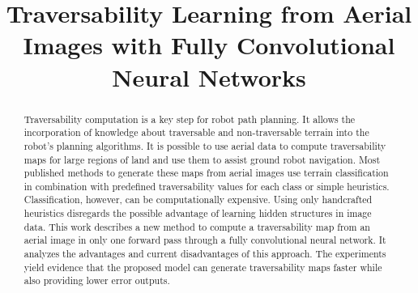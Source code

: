 \documentclass[conference]{IEEEtran}
\begin{document}
\title{Traversability Learning from Aerial Images with Fully Convolutional Neural Networks\\
}

\author{
}

\maketitle

\begin{abstract}
Traversability computation is a key step for robot path planning.
It allows the incorporation of knowledge about traversable and non-traversable terrain into the robot's planning algorithms.
It is possible to use aerial data to compute traversability maps for large regions of land and use them to assist ground robot navigation.
Most published methods to generate these maps from aerial images use terrain classification in combination with predefined traversability values for each class or simple heuristics.
Classification, however, can be computationally expensive. 
Using only handcrafted heuristics disregards the possible advantage of learning hidden structures in image data.
This work describes a new method to compute a traversability map from an aerial image in only one forward pass through a fully convolutional neural network.
It analyzes the advantages and current disadvantages of this approach.
The experiments yield evidence that the proposed model can generate traversability maps faster while also providing lower error outputs.
\end{abstract}
\end{document}
